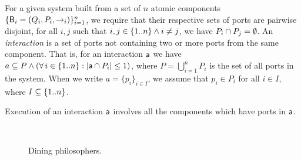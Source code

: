 \bd[Interaction] For a given system built from a set of $n$ atomic components 
$\{\mathsf{B}_i = (Q_i, P_i, \stackrel{}{\rightarrow}_i)\}_{i=1}^n$, we require that their respective sets of ports are
pairwise disjoint,
\ie for all $i, j$ such that $i, j \in \{ 1..n \} \land i \ne j$, we have $P_i \cap P_j = \emptyset$.
An {\em interaction} is a set of ports not containing two or more ports from the same component.
That is, for an interaction $\mathsf{a}$ we have 
$a \subseteq P \land (\forall\, i \in \{ 1..n \}: |\mathsf{a} \cap P_i| \le 1)$, where 
$P = \bigcup_{i=1}^n P_i$ is the set of all ports in the
system. When we write $a = \{p_i\}_{i \in I}$, we assume that
$p_i \in P_i$ for all $i \in I$, where $I \subseteq \{ 1..n \}$.
\ed

\noindent
Execution of an interaction $\mathsf{a}$ involves all the components which have
ports in $\mathsf{a}$.  



\begin{figure}[t]
  \begin{center}
    \mbox{
       \quad
      }
    \caption{Dining philosophers.}
    \label{fig:diningSpectrum}
  \end{center}
\end{figure}








